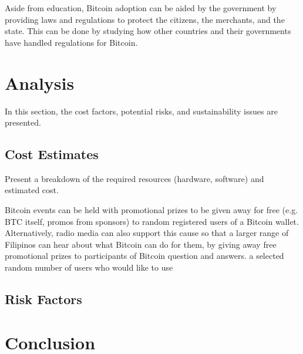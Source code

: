 \documentclass{acm_proc_article-sp}
\begin{document}
Aside from education, Bitcoin adoption can be aided by the government by providing laws and regulations to protect the citizens, the merchants, and the state. This can be done by studying how other countries and their governments have handled regulations for Bitcoin.

\section{Analysis}
In this section, the cost factors, potential risks, and sustainability issues are presented.

\subsection{Cost Estimates}
Present a breakdown of the required resources (hardware, software) and estimated cost.

Bitcoin events can be held with promotional prizes to be given away for free (e.g. BTC itself, promos from sponsors) to random registered users of a Bitcoin wallet. Alternatively, radio media can also support this cause so that a larger range of Filipinos can hear about what Bitcoin can do for them, by giving away free promotional prizes to participants of Bitcoin question and answers. a selected random number of users who would like to use 

\subsection{Risk Factors}

\section{Conclusion}



  
\end{document}
